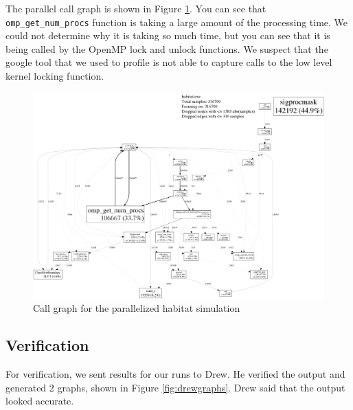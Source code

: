 \documentclass[12pt, notitlepage]{article}
\begin{document}
The parallel call graph is shown in Figure \ref{fig:parallelcall}.  You can see that \texttt{omp\_get\_num\_procs} function is taking a large amount of the processing time.  We could not determine why it is taking so much time, but you can see that it is being called by the OpenMP lock and unlock functions.  We suspect that the google tool that we used to profile is not able to capture calls to the low level kernel locking function.

\begin{figure}[ht]
\includegraphics[width=\textwidth]{Include/parallelcall.pdf}
\caption{Call graph for the parallelized habitat simulation} \label{fig:parallelcall}
\end{figure}

\subsection{Verification}
For verification, we sent results for our runs to Drew.  He verified the output and generated 2 graphs, shown in Figure \ref{fig:drewgraphs}.  Drew said that the output looked accurate.
\end{document}
